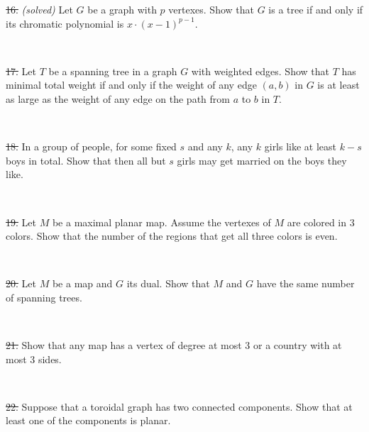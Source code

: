\documentclass[oneside,a4paper]{article}
\begin{document}
\noindent \sout{16.} \textit{(solved)}
Let $G$ be a graph with $p$ vertexes.
Show that  $G$ is a tree if and only if
its chromatic polynomial is $x\cdot(x-1)^{p-1}$.

\ 

\noindent \sout{17.} Let $T$ be a spanning tree in a graph $G$ with weighted edges.
Show that $T$ has minimal total weight if and only if the weight of any edge $(a,b)$ in $G$ is at least as large as the weight of any edge on the path from $a$ to $b$ in $T$. 


\ 

\noindent \sout{18.} In a group of people, for some fixed $s$ and any $k$,
any $k$ girls like at least $k-s$ boys in total.
Show that then all but $s$ girls may get married on the boys they like.

\ 

\noindent \sout{19.} %
Let $M$ be a maximal planar map.
Assume the vertexes of $M$ are colored in 3 colors.
Show that the number of the regions that get all three colors is even.

\ 

\noindent \sout{20.}
Let $M$ be a map and $G$ its dual.
Show that $M$ and $G$ have the same number of spanning trees.

\ 

\noindent %
\sout{21.} %
Show that any map has a vertex of degree at most 3 or a country with at most 3 sides.

\ 

\noindent %
\sout{22.} %
Suppose that a toroidal graph has two connected components.
Show that at least one of the components is planar.
\end{document}

